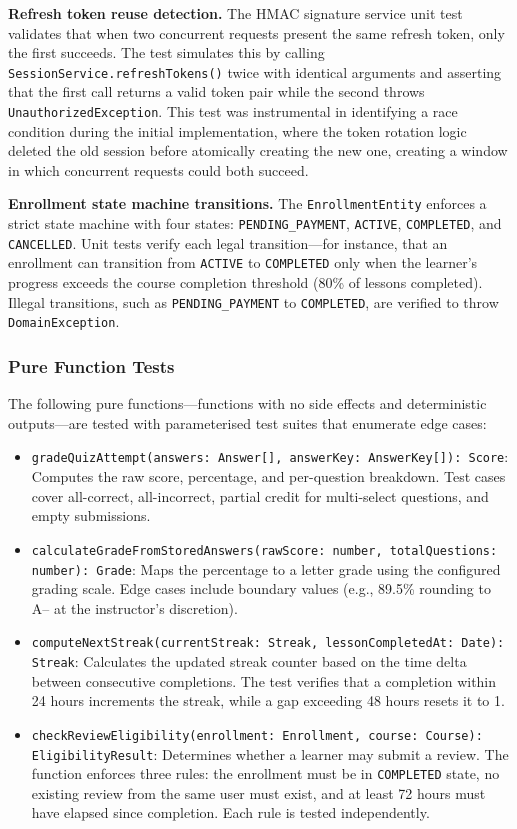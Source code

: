 \textbf{Refresh token reuse detection.} The HMAC signature service unit test validates that when two concurrent requests present the same refresh token, only the first succeeds. The test simulates this by calling \texttt{SessionService.refreshTokens()} twice with identical arguments and asserting that the first call returns a valid token pair while the second throws \texttt{UnauthorizedException}. This test was instrumental in identifying a race condition during the initial implementation, where the token rotation logic deleted the old session before atomically creating the new one, creating a window in which concurrent requests could both succeed.

\textbf{Enrollment state machine transitions.} The \texttt{EnrollmentEntity} enforces a strict state machine with four states: \texttt{PENDING\_PAYMENT}, \texttt{ACTIVE}, \texttt{COMPLETED}, and \texttt{CANCELLED}. Unit tests verify each legal transition---for instance, that an enrollment can transition from \texttt{ACTIVE} to \texttt{COMPLETED} only when the learner's progress exceeds the course completion threshold (80\% of lessons completed). Illegal transitions, such as \texttt{PENDING\_PAYMENT} to \texttt{COMPLETED}, are verified to throw \texttt{DomainException}.

\subsubsection{Pure Function Tests}

The following pure functions---functions with no side effects and deterministic outputs---are tested with parameterised test suites that enumerate edge cases:

\begin{itemize}
  \item \texttt{gradeQuizAttempt(answers: Answer[], answerKey: AnswerKey[]): Score}: Computes the raw score, percentage, and per-question breakdown. Test cases cover all-correct, all-incorrect, partial credit for multi-select questions, and empty submissions.
  \item \texttt{calculateGradeFromStoredAnswers(rawScore: number, totalQuestions: number): Grade}: Maps the percentage to a letter grade using the configured grading scale. Edge cases include boundary values (e.g., 89.5\% rounding to A-- at the instructor's discretion).
  \item \texttt{computeNextStreak(currentStreak: Streak, lessonCompletedAt: Date): Streak}: Calculates the updated streak counter based on the time delta between consecutive completions. The test verifies that a completion within 24 hours increments the streak, while a gap exceeding 48 hours resets it to 1.
  \item \texttt{checkReviewEligibility(enrollment: Enrollment, course: Course): EligibilityResult}: Determines whether a learner may submit a review. The function enforces three rules: the enrollment must be in \texttt{COMPLETED} state, no existing review from the same user must exist, and at least 72 hours must have elapsed since completion. Each rule is tested independently.
\end{itemize}
